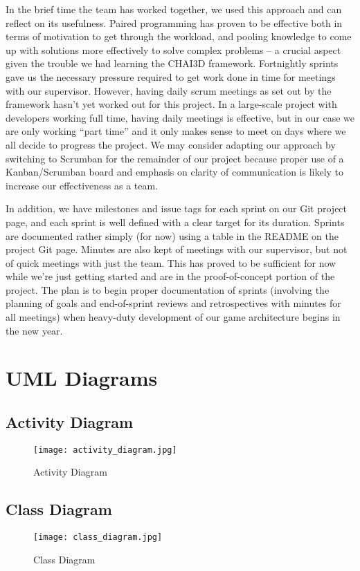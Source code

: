 \documentclass[a4paper]{article}
\begin{document}
In the brief time the team has worked together, we used this approach and can reflect on its usefulness. Paired programming has proven to be effective both in terms of motivation to get through the workload, and pooling knowledge to come up with solutions more effectively to solve complex problems – a crucial aspect given the trouble we had learning the CHAI3D framework. Fortnightly sprints gave us the necessary pressure required to get work done in time for meetings with our supervisor. However, having daily scrum meetings as set out by the framework hasn’t yet worked out for this project. In a large-scale project with developers working full time, having daily meetings is effective, but in our case we are only working “part time” and it only makes sense to meet on days where we all decide to progress the project. We may consider adapting our approach by switching to Scrumban for the remainder of our project because proper use of a Kanban/Scrumban board and emphasis on clarity of communication is likely to increase our effectiveness as a team.

In addition, we have milestones and issue tags for each sprint on our Git project page, and each sprint is well defined with a clear target for its duration. Sprints are documented rather simply (for now) using a table in the README on the project Git page. Minutes are also kept of meetings with our supervisor, but not of quick meetings with just the team. This has proved to be sufficient for now while we’re just getting started and are in the proof-of-concept portion of the project. The plan is to begin proper documentation of sprints (involving the planning of goals and end-of-sprint reviews and retrospectives with minutes for all meetings) when heavy-duty development of our game architecture begins in the new year.

\section{UML Diagrams}
\subsection{Activity Diagram}
\begin{figure}[H]
    \centering
    \texttt{[image: activity\_diagram.jpg]}
    \caption{Activity Diagram}
    \label{fig:activity}
\end{figure}

\subsection{Class Diagram}
\begin{figure}[H]
    \centering
    \texttt{[image: class\_diagram.jpg]}
    \caption{Class Diagram}
    \label{fig:class}
\end{figure}
\end{document}
